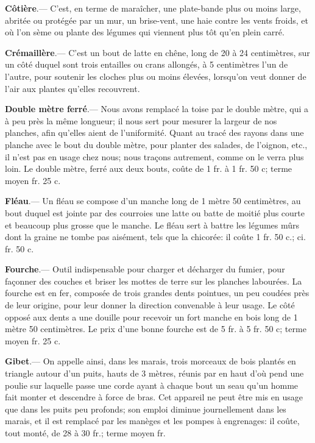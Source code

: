 \documentclass[10pt,a4paper]{book}
\begin{document}
\textbf{Côtière}.--- C'est, en terme de maraîcher, une plate-bande plus ou moins large, abritée ou protégée par un mur, un brise-vent, une haie contre les vents froids, et où l'on sème ou plante des légumes qui viennent plus tôt qu'en plein carré.

\textbf{Crémaillère}.--- C'est un bout de latte en chêne, long de 20 à 24 centimètres, sur un côté duquel sont trois entailles ou crans allongés, à 5 centimètres l'un de l'autre, pour soutenir les cloches plus ou moins élevées, lorsqu'on veut donner de l'air aux plantes qu'elles recouvrent.

\textbf{Double mètre ferré}.--- Nous avons remplacé la toise par le double mètre, qui a à peu près la même longueur; il nous sert pour mesurer la largeur de nos planches, afin qu'elles aient de l'uniformité. Quant au tracé des rayons dans une planche avec le bout du double mètre, pour planter des salades, de l'oignon, etc., il n'est pas en usage chez nous; nous traçons autrement, comme on le verra plus loin. Le double mètre, ferré aux deux bouts, coûte de 1 fr. à 1 fr. 50 c; terme moyen  fr. 25 c.

\textbf{Fléau}.--- Un fléau se compose d'un manche long de 1 mètre 50 centimètres, au bout duquel est jointe par des courroies une latte ou batte de moitié plus courte et beaucoup plus grosse que le manche. Le fléau sert à battre les légumes mûrs dont la graine ne tombe pas aisément, tels que la chicorée: il coûte 1 fr. 50 c.; ci. fr. 50 c.

\textbf{Fourche}.--- Outil indispensable pour charger et décharger du fumier, pour façonner des couches et briser les mottes de terre sur les planches labourées. La fourche est en fer, composée de trois grandes dents pointues, un peu coudées près de leur origine, pour leur donner la direction convenable à leur usage. Le côté opposé aux dents a une douille pour recevoir un fort manche en bois long de 1 mètre 50 centimètres. Le prix d'une bonne fourche est de 5 fr. à 5 fr. 50 c; terme moyen  fr. 25 c.

\textbf{Gibet}.--- On appelle ainsi, dans les marais, trois morceaux de bois plantés en triangle autour d'un puits, hauts de 3 mètres, réunis par en haut d'où pend une poulie sur laquelle passe une corde ayant à chaque bout un seau qu'un homme fait monter et descendre à force de bras. Cet appareil ne peut être mis en usage que dans les puits peu profonds; son emploi diminue journellement dans les marais, et il est remplacé par les manèges et les pompes à engrenages: il coûte, tout monté, de 28 à 30 fr.; terme moyen  fr.
\end{document}
